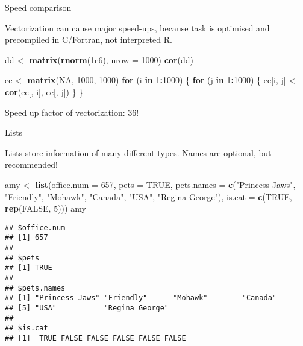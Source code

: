 \documentclass[ignorenonframetext,]{beamer}
\newenvironment{Shaded}{\begin{snugshade}}{\end{snugshade}}
\newcommand{\ControlFlowTok}[1]{\textcolor[rgb]{0.13,0.29,0.53}{\textbf{#1}}}
\newcommand{\DataTypeTok}[1]{\textcolor[rgb]{0.13,0.29,0.53}{#1}}
\newcommand{\DecValTok}[1]{\textcolor[rgb]{0.00,0.00,0.81}{#1}}
\newcommand{\FloatTok}[1]{\textcolor[rgb]{0.00,0.00,0.81}{#1}}
\newcommand{\KeywordTok}[1]{\textcolor[rgb]{0.13,0.29,0.53}{\textbf{#1}}}
\newcommand{\NormalTok}[1]{#1}
\newcommand{\OperatorTok}[1]{\textcolor[rgb]{0.81,0.36,0.00}{\textbf{#1}}}
\newcommand{\OtherTok}[1]{\textcolor[rgb]{0.56,0.35,0.01}{#1}}
\newcommand{\StringTok}[1]{\textcolor[rgb]{0.31,0.60,0.02}{#1}}
\begin{document}
\begin{frame}[fragile]{Speed comparison}
\protect\hypertarget{speed-comparison}{}

Vectorization can cause major speed-ups, because task is optimised and
precompiled in C/Fortran, not interpreted R.

\begin{Shaded}
\begin{Highlighting}[]
\NormalTok{dd <-}\StringTok{ }\KeywordTok{matrix}\NormalTok{(}\KeywordTok{rnorm}\NormalTok{(}\FloatTok{1e6}\NormalTok{), }\DataTypeTok{nrow =} \DecValTok{1000}\NormalTok{)}
\KeywordTok{cor}\NormalTok{(dd)}

\NormalTok{ee <-}\StringTok{ }\KeywordTok{matrix}\NormalTok{(}\OtherTok{NA}\NormalTok{, }\DecValTok{1000}\NormalTok{, }\DecValTok{1000}\NormalTok{)}
\ControlFlowTok{for}\NormalTok{ (i }\ControlFlowTok{in} \DecValTok{1}\OperatorTok{:}\DecValTok{1000}\NormalTok{) \{}
  \ControlFlowTok{for}\NormalTok{ (j }\ControlFlowTok{in} \DecValTok{1}\OperatorTok{:}\DecValTok{1000}\NormalTok{) \{}
\NormalTok{    ee[i, j] <-}\StringTok{ }\KeywordTok{cor}\NormalTok{(ee[, i], ee[, j])}
\NormalTok{  \}}
\NormalTok{\}}
\end{Highlighting}
\end{Shaded}

Speed up factor of vectorization: 36!

\end{frame}

\begin{frame}[fragile]{Lists}
\protect\hypertarget{lists}{}

Lists store information of many different types. Names are optional, but
recommended!

\footnotesize

\begin{Shaded}
\begin{Highlighting}[]
\NormalTok{amy <-}\StringTok{ }\KeywordTok{list}\NormalTok{(}\DataTypeTok{office.num =} \DecValTok{657}\NormalTok{, }\DataTypeTok{pets =} \OtherTok{TRUE}\NormalTok{,}
            \DataTypeTok{pets.names =} \KeywordTok{c}\NormalTok{(}\StringTok{"Princess Jaws"}\NormalTok{, }\StringTok{"Friendly"}\NormalTok{, }\StringTok{"Mohawk"}\NormalTok{,}
                           \StringTok{"Canada"}\NormalTok{, }\StringTok{"USA"}\NormalTok{, }\StringTok{"Regina George"}\NormalTok{),}
            \DataTypeTok{is.cat =} \KeywordTok{c}\NormalTok{(}\OtherTok{TRUE}\NormalTok{, }\KeywordTok{rep}\NormalTok{(}\OtherTok{FALSE}\NormalTok{, }\DecValTok{5}\NormalTok{)))}
\NormalTok{amy}
\end{Highlighting}
\end{Shaded}

\begin{verbatim}
## $office.num
## [1] 657
## 
## $pets
## [1] TRUE
## 
## $pets.names
## [1] "Princess Jaws" "Friendly"      "Mohawk"        "Canada"       
## [5] "USA"           "Regina George"
## 
## $is.cat
## [1]  TRUE FALSE FALSE FALSE FALSE FALSE
\end{verbatim}

\end{frame}
\end{document}
